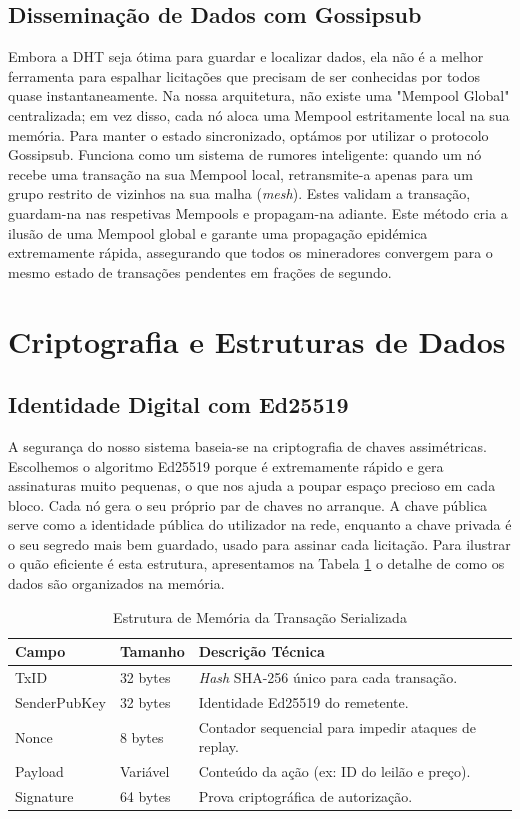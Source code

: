 \documentclass[11pt]{article}
\begin{document}
\subsection{Disseminação de Dados com Gossipsub}
Embora a DHT seja ótima para guardar e localizar dados, ela não é a melhor ferramenta para espalhar licitações que precisam de ser conhecidas por todos quase instantaneamente. Na nossa arquitetura, não existe uma "Mempool Global" centralizada; em vez disso, cada nó aloca uma Mempool estritamente local na sua memória. Para manter o estado sincronizado, optámos por utilizar o protocolo Gossipsub. Funciona como um sistema de rumores inteligente: quando um nó recebe uma transação na sua Mempool local, retransmite-a apenas para um grupo restrito de vizinhos na sua malha (\textit{mesh}). Estes validam a transação, guardam-na nas respetivas Mempools e propagam-na adiante. Este método cria a ilusão de uma Mempool global e garante uma propagação epidémica extremamente rápida, assegurando que todos os mineradores convergem para o mesmo estado de transações pendentes em frações de segundo.

\section{Criptografia e Estruturas de Dados}

\subsection{Identidade Digital com Ed25519}
A segurança do nosso sistema baseia-se na criptografia de chaves assimétricas. Escolhemos o algoritmo Ed25519 porque é extremamente rápido e gera assinaturas muito pequenas, o que nos ajuda a poupar espaço precioso em cada bloco. Cada nó gera o seu próprio par de chaves no arranque. A chave pública serve como a identidade pública do utilizador na rede, enquanto a chave privada é o seu segredo mais bem guardado, usado para assinar cada licitação. Para ilustrar o quão eficiente é esta estrutura, apresentamos na Tabela \ref{tab:tx_structure} o detalhe de como os dados são organizados na memória.

\begin{table}[H]
\centering
\caption{Estrutura de Memória da Transação Serializada}
\label{tab:tx_structure}
\begin{tabular}{@{}llp{8cm}@{}}
\toprule
\textbf{Campo} & \textbf{Tamanho} & \textbf{Descrição Técnica} \\ \midrule
TxID & 32 bytes & \textit{Hash} SHA-256 único para cada transação. \\ 
SenderPubKey & 32 bytes & Identidade Ed25519 do remetente. \\ 
Nonce & 8 bytes & Contador sequencial para impedir ataques de replay. \\ 
Payload & Variável & Conteúdo da ação (ex: ID do leilão e preço). \\ 
Signature & 64 bytes & Prova criptográfica de autorização. \\ \bottomrule
\end{tabular}
\end{table}
\end{document}
